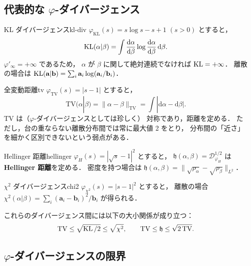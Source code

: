 \subsection{代表的な $\varphi$-ダイバージェンス}\label{subsec:phi-examples}

\begin{example}{KL ダイバージェンス}{kl-div}
$\varphi_{\mathrm{KL}}(s) = s \log s - s + 1$ $( s > 0)$ とすると，
\[
  \operatorname{KL}(\alpha|\beta) = \int \frac{\mathrm{d}\alpha}{\mathrm{d}\beta}
  \log \frac{\mathrm{d}\alpha}{\mathrm{d}\beta}\, \mathrm{d}\beta.
\]
$\varphi'_\infty = +\infty$ であるため，
$\alpha$ が $\beta$ に関して絶対連続でなければ $\operatorname{KL} = +\infty$．
離散の場合は $\operatorname{KL}(\mathbf{a}|\mathbf{b})
= \sum_i \mathbf{a}_i \log(\mathbf{a}_i / \mathbf{b}_i)$．
\end{example}

\begin{example}{全変動距離}{tv}
$\varphi_{\mathrm{TV}}(s) = |s - 1|$ とすると，
\[
  \mathrm{TV}(\alpha|\beta) = \|\alpha - \beta\|_{\mathrm{TV}}
  = \int |\mathrm{d}\alpha - \mathrm{d}\beta|.
\]
$\mathrm{TV}$ は（$\varphi$-ダイバージェンスとしては珍しく）
対称であり，距離を定める．
ただし，台の重ならない離散分布間では常に最大値 2 をとり，
分布間の「近さ」を細かく区別できないという弱点がある．
\end{example}

\begin{example}{Hellinger 距離}{hellinger}
$\varphi_H(s) = |\sqrt{s} - 1|^2$ とすると，
$\mathfrak{h}(\alpha, \beta) = \mathcal{D}_{\varphi_H}^{1/2}$
は\textbf{Hellinger 距離}を定める．
密度を持つ場合は
$\mathfrak{h}(\alpha, \beta) = \|\sqrt{\rho_\alpha} - \sqrt{\rho_\beta}\|_{L^2}$．
\end{example}

\begin{example}{$\chi^2$ ダイバージェンス}{chi2}
$\varphi_{\chi^2}(s) = |s-1|^2$ とすると，
離散の場合
$\chi^2(\alpha|\beta) = \sum_i (\mathbf{a}_i - \mathbf{b}_i)^2 / \mathbf{b}_i$
が得られる．
\end{example}

これらのダイバージェンス間には以下の大小関係が成り立つ：
\[
  \mathrm{TV} \leq \sqrt{\operatorname{KL}/2}
  \leq \sqrt{\chi^2},
  \qquad
  \mathrm{TV} \leq \mathfrak{h} \leq \sqrt{2\, \mathrm{TV}}.
\]

\subsection{$\varphi$-ダイバージェンスの限界}\label{subsec:phi-limitation}

